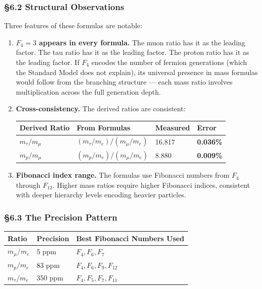 \documentclass[
  11pt,
  a4paper]{article}
\begin{document}
\subsubsection{§6.2 Structural
Observations}\label{structural-observations}

Three features of these formulas are notable:

\begin{enumerate}
\def\labelenumi{\arabic{enumi}.}
\item
  \textbf{\(F_4 = 3\) appears in every formula.} The muon ratio has it
  as the leading factor. The tau ratio has it as the leading factor. The
  proton ratio has it as the leading factor. If \(F_4\) encodes the
  number of fermion generations (which the Standard Model does not
  explain), its universal presence in mass formulas would follow from
  the branching structure --- each mass ratio involves multiplication
  across the full generation depth.
\item
  \textbf{Cross-consistency.} The derived ratios are consistent:

  \begin{longtable}[]{@{}llll@{}}
  \toprule\noalign{}
  Derived Ratio & From Formulas & Measured & Error \\
  \midrule\noalign{}
  \endhead
  \bottomrule\noalign{}
  \endlastfoot
  \(m_\tau/m_\mu\) & \((m_\tau/m_e)/(m_\mu/m_e)\) & 16.817 &
  \textbf{0.036\%} \\
  \(m_p/m_\mu\) & \((m_p/m_e)/(m_\mu/m_e)\) & 8.880 &
  \textbf{0.009\%} \\
  \end{longtable}
\item
  \textbf{Fibonacci index range.} The formulas use Fibonacci numbers
  from \(F_4\) through \(F_{12}\). Higher mass ratios require higher
  Fibonacci indices, consistent with deeper hierarchy levels encoding
  heavier particles.
\end{enumerate}

\subsubsection{§6.3 The Precision Pattern}\label{the-precision-pattern}

\begin{longtable}[]{@{}lll@{}}
\toprule\noalign{}
Ratio & Precision & Best Fibonacci Numbers Used \\
\midrule\noalign{}
\endhead
\bottomrule\noalign{}
\endlastfoot
\(m_\mu/m_e\) & 5 ppm & \(F_4, F_6, F_7\) \\
\(m_p/m_e\) & 83 ppm & \(F_4, F_6, F_9, F_{12}\) \\
\(m_\tau/m_e\) & 350 ppm & \(F_4, F_5, F_7, F_{11}\) \\
\end{longtable}
\end{document}
